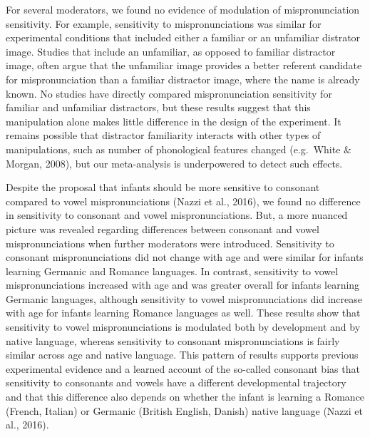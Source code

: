 \documentclass[man]{apa6}
\begin{document}
For several moderators, we found no evidence of modulation of mispronunciation sensitivity. For example, sensitivity to mispronunciations was similar for experimental conditions that included either a familiar or an unfamiliar distrator image. Studies that include an unfamiliar, as opposed to familiar distractor image, often argue that the unfamiliar image provides a better referent candidate for mispronunciation than a familiar distractor image, where the name is already known. No studies have directly compared mispronunciation sensitivity for familiar and unfamiliar distractors, but these results suggest that this manipulation alone makes little difference in the design of the experiment. It remains possible that distractor familiarity interacts with other types of manipulations, such as number of phonological features changed (e.g.~White \& Morgan, 2008), but our meta-analysis is underpowered to detect such effects.

Despite the proposal that infants should be more sensitive to consonant compared to vowel mispronunciations (Nazzi et al., 2016), we found no difference in sensitivity to consonant and vowel mispronunciations. But, a more nuanced picture was revealed regarding differences between consonant and vowel mispronunciations when further moderators were introduced. Sensitivity to consonant mispronunciations did not change with age and were similar for infants learning Germanic and Romance languages. In contrast, sensitivity to vowel mispronunciations increased with age and was greater overall for infants learning Germanic languages, although sensitivity to vowel mispronunciations did increase with age for infants learning Romance languages as well. These results show that sensitivity to vowel mispronunciations is modulated both by development and by native language, whereas sensitivity to consonant mispronunciations is fairly similar across age and native language. This pattern of results supports previous experimental evidence and a learned account of the so-called consonant bias that sensitivity to consonants and vowels have a different developmental trajectory and that this difference also depends on whether the infant is learning a Romance (French, Italian) or Germanic (British English, Danish) native language (Nazzi et al., 2016).
\end{document}
